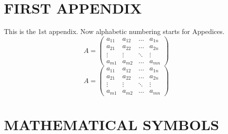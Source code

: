 
\begin{appendices}

\chapter{FIRST APPENDIX}

This is the 1st appendix.  Now alphabetic numbering starts for Appedices.
\ifAMS
\begin{equation}
    A=
    \begin{pmatrix}
	a_{11}&a_{12}&\ldots&a_{1n}\\
	a_{21}&a_{22}&\ldots&a_{2n}\\
	\vdots&\vdots&\ddots&\vdots\\
	a_{m1}&a_{m2}&\ldots&a_{mn}
    \end{pmatrix}
\end{equation}
\else
\begin{equation}
    A=
    \left(
    \begin{array}{cccc}
	a_{11}&a_{12}&\ldots&a_{1n}\\
	a_{21}&a_{22}&\ldots&a_{2n}\\
	\vdots&\vdots&\ddots&\vdots\\
	a_{m1}&a_{m2}&\ldots&a_{mn}
    \end{array}
    \right)
\end{equation}
\fi

\chapter{MATHEMATICAL SYMBOLS}
\label{sec:mathsym}


\end{appendices}
